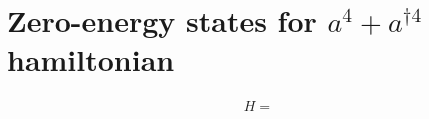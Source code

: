 \documentclass[aps,prb,twocolumn,letterpaper,twoside,nobalancelastpage,groupedaddress,amsmath,amssymb,floatfix,citeautoscript]{revtex4-1}
\begin{document}

\section{Zero-energy states for $a^4 + a^{\dag 4}$ hamiltonian}
\label{zero-enegy-quartic}
\begin{align*}
H = 
\end{align*}


\end{document}
